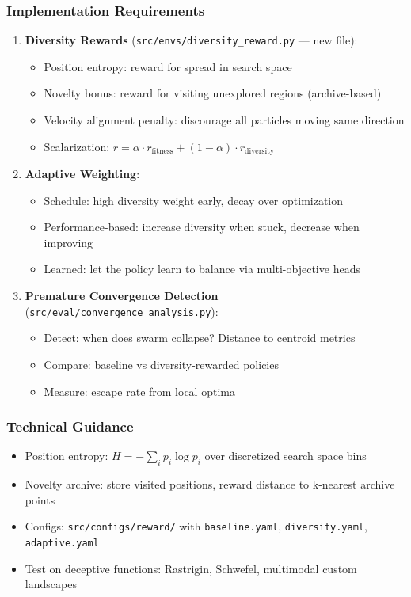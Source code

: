\documentclass[11pt,a4paper]{scrartcl}
\newcommand{\codepath}[1]{\colorbox{codehighlight}{\texttt{#1}}}
\begin{document}
\subsubsection*{Implementation Requirements}
\begin{enumerate}[leftmargin=1.4em]
    \item \textbf{Diversity Rewards} (\codepath{src/envs/diversity\_reward.py} --- new file):
    \begin{itemize}
        \item Position entropy: reward for spread in search space
        \item Novelty bonus: reward for visiting unexplored regions (archive-based)
        \item Velocity alignment penalty: discourage all particles moving same direction
        \item Scalarization: $r = \alpha \cdot r_{\text{fitness}} + (1-\alpha) \cdot r_{\text{diversity}}$
    \end{itemize}
    
    \item \textbf{Adaptive Weighting}:
    \begin{itemize}
        \item Schedule: high diversity weight early, decay over optimization
        \item Performance-based: increase diversity when stuck, decrease when improving
        \item Learned: let the policy learn to balance via multi-objective heads
    \end{itemize}
    
    \item \textbf{Premature Convergence Detection} (\codepath{src/eval/convergence\_analysis.py}):
    \begin{itemize}
        \item Detect: when does swarm collapse? Distance to centroid metrics
        \item Compare: baseline vs diversity-rewarded policies
        \item Measure: escape rate from local optima
    \end{itemize}
\end{enumerate}

\subsubsection*{Technical Guidance}
\begin{itemize}
    \item Position entropy: $H = -\sum_i p_i \log p_i$ over discretized search space bins
    \item Novelty archive: store visited positions, reward distance to k-nearest archive points
    \item Configs: \codepath{src/configs/reward/} with \texttt{baseline.yaml}, \texttt{diversity.yaml}, \texttt{adaptive.yaml}
    \item Test on deceptive functions: Rastrigin, Schwefel, multimodal custom landscapes
\end{itemize}
\end{document}
